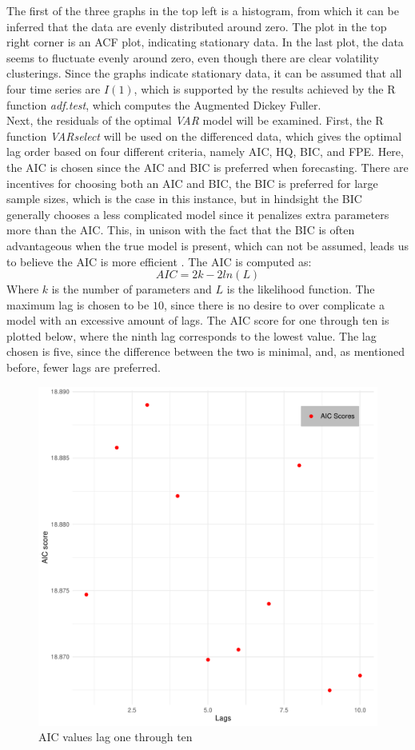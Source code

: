 \noindent The first of the three graphs in the top left is a histogram, from which it can be inferred that the data are evenly distributed around zero. The plot in the top right corner is an ACF plot, indicating stationary data. In the last plot, the data seems to fluctuate evenly around zero, even though there are clear volatility clusterings. 
Since the graphs indicate stationary data, it can be assumed that all four time series are $I(1)$, which is supported by the results achieved by the R function \textit{adf.test}, which computes the Augmented Dickey Fuller.\\

\noindent Next, the residuals of the optimal \textit{VAR} model will be examined. First, the R function \textit{VARselect} will be used on the differenced data, which gives the optimal lag order based on four different criteria, namely AIC, HQ, BIC, and FPE. 
Here, the AIC is chosen since the AIC and BIC is preferred when forecasting. There are incentives for choosing both an AIC and BIC, the BIC is preferred for large sample sizes, which is the case in this instance, but in hindsight the BIC generally chooses a less complicated model since it penalizes extra parameters more than the AIC. This, in unison with the fact that the BIC is often advantageous when the true model is present, which can not be assumed, leads us to believe the AIC is more efficient \cite{AICorBIC}. The AIC is computed as:
\begin{equation*}
    AIC=2k-2ln(L)
\end{equation*}
Where $k$ is the number of parameters and $L$ is the likelihood function. The maximum lag is chosen to be $10$, since there is no desire to over complicate a model with an excessive amount of lags. The AIC score for one through ten is plotted below, where the ninth lag corresponds to the lowest value. The lag chosen is five, since the difference between the two is minimal, and, as mentioned before, fewer lags are preferred.
\begin{figure}[H]
    \centering
    \includegraphics[width=0.5\linewidth]{1.Projekt_kode/Billeder/Crypto_lags.pdf}
    \caption{AIC values lag one through ten}
\end{figure}
